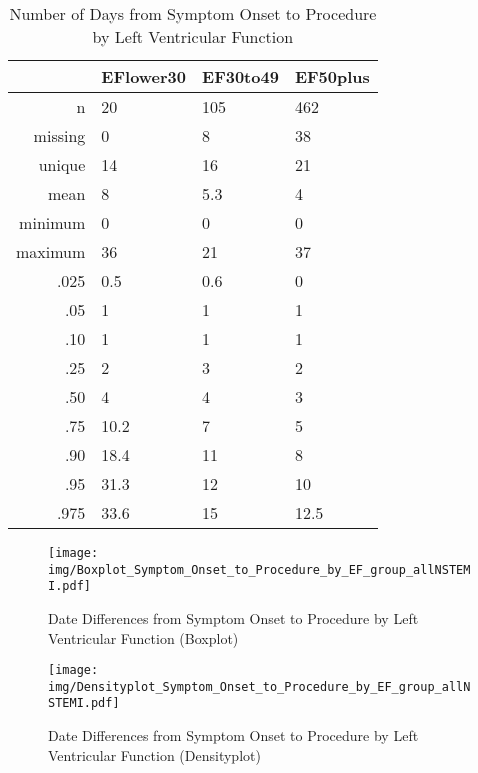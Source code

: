 \documentclass[a4paper]{report}
\begin{document}
\begin{itemize}
{%
\begin{table}[ht]
\centering
\begin{tabular}{rlll}
  \toprule
 & EFlower30 & EF30to49 & EF50plus \\ 
  \midrule
n & 20 & 105 & 462 \\ 
  missing & 0 & 8 & 38 \\ 
  unique & 14 & 16 & 21 \\ 
  mean & 8 & 5.3 & 4 \\ 
  minimum & 0 & 0 & 0 \\ 
  maximum & 36 & 21 & 37 \\ 
  .025 & 0.5 & 0.6 & 0 \\ 
  .05 & 1 & 1 & 1 \\ 
  .10 & 1 & 1 & 1 \\ 
  .25 & 2 & 3 & 2 \\ 
  .50 & 4 & 4 & 3 \\ 
  .75 & 10.2 & 7 & 5 \\ 
  .90 & 18.4 & 11 & 8 \\ 
  .95 & 31.3 & 12 & 10 \\ 
  .975 & 33.6 & 15 & 12.5 \\ 
   \bottomrule
\end{tabular}
\caption{Number of Days from Symptom Onset to Procedure by Left Ventricular Function} 
\end{table}
\begin{figure}
  \centering
  \caption{Date Differences from Symptom Onset to Procedure by Left Ventricular Function (Boxplot)}
  \label{Boxplot: Date Differences from Symptom Onset to Procedure by Left Ventricular Function}
\texttt{[image: img/Boxplot\_Symptom\_Onset\_to\_Procedure\_by\_EF\_group\_allNSTEMI.pdf]}\end{figure}


\begin{figure}
  \centering
  \caption{Date Differences from Symptom Onset to Procedure by Left Ventricular Function (Densityplot)}
  \label{Density: Date Differences from Symptom Onset to Procedure by Left Ventricular Function}
\texttt{[image: img/Densityplot\_Symptom\_Onset\_to\_Procedure\_by\_EF\_group\_allNSTEMI.pdf]}\end{figure}


\clearpage

}
\end{itemize}
\end{document}
